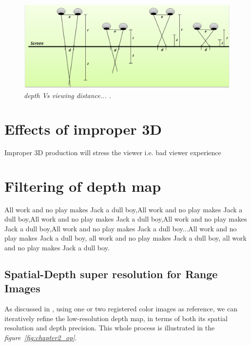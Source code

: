 \begin{figure}[ht]
\centerline{\includegraphics[width=1.0\textwidth]{depth_Vs_viewing_distance.png}}
\caption{\textit{depth Vs viewing distance... \cite{bib:video_production}} \label{fig:depth Vs viewing distance}.}
\end{figure}

\section{Effects of improper 3D}
Improper 3D production will stress the viewer i.e. bad viewer experience 



\section{Filtering of depth map}
All work and no play makes Jack a dull boy,All work and no play makes Jack a dull boy,All work and no play makes Jack a dull boy,All work and no play makes Jack a dull boy,All work and no play makes Jack a dull boy...All work and no play makes Jack a dull boy, all work and no play makes Jack a dull boy, all work and no play makes Jack a dull boy.

\subsection{Spatial-Depth super resolution for Range Images}
As discussed in \cite{Spatial_Depth_Super_Resolution}, using one or two registered color images as reference, we can iteratively refine the low-resolution depth map, in terms of both its spatial resolution and depth precision. This whole process is illustrated in the \textit{figure~\ref{fig:chapter2_op}}.

